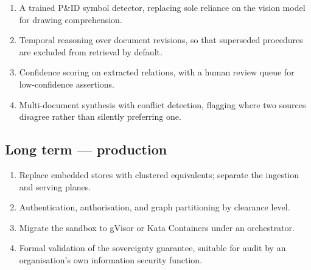 \begin{enumerate}
\item A trained P\&ID symbol detector, replacing sole reliance on the vision
      model for drawing comprehension.
\item Temporal reasoning over document revisions, so that superseded procedures
      are excluded from retrieval by default.
\item Confidence scoring on extracted relations, with a human review queue for
      low-confidence assertions.
\item Multi-document synthesis with conflict detection, flagging where two
      sources disagree rather than silently preferring one.
\end{enumerate}

\subsection{Long term --- production}

\begin{enumerate}
\item Replace embedded stores with clustered equivalents; separate the
      ingestion and serving planes.
\item Authentication, authorisation, and graph partitioning by clearance level.
\item Migrate the sandbox to gVisor or Kata Containers under an orchestrator.
\item Formal validation of the sovereignty guarantee, suitable for audit by an
      organisation's own information security function.
\end{enumerate}
